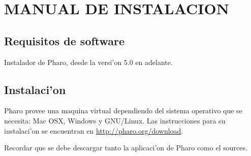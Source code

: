 \chapter{MANUAL DE INSTALACION}

\section{Requisitos de software}
Instalador de Pharo, desde la versi'on 5.0 en adelante.

\section{Instalaci'on}
Pharo provee una maquina virtual dependiendo del sistema operativo que se necesita: Mac OSX, Windows y GNU/Linux. Las instrucciones para su instalaci'on se encuentran en \url{http://pharo.org/download}.

Recordar que se debe descargar tanto la aplicaci'on de Pharo como el sources.
